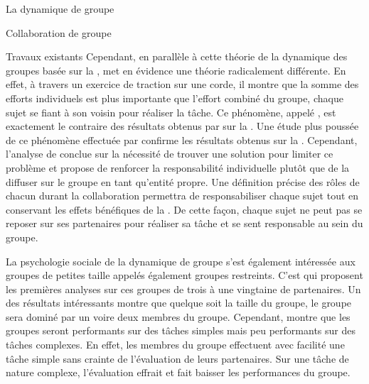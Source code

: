 \documentclass[myfrancais]{mythesis}
\begin{document}
\begin{mychapter}{La dynamique de groupe}
\begin{mysection}{Collaboration de groupe}
\begin{mysubsection}{Travaux existants}
				Cependant, en parallèle à cette théorie de la dynamique des groupes basée sur la ,  met en évidence une théorie radicalement différente.
				En effet, à travers un exercice de traction sur une corde, il montre que la somme des efforts individuels est plus importante que l'effort combiné du groupe, chaque sujet se fiant à son voisin pour réaliser la tâche.
				Ce phénomène, appelé , est exactement le contraire des résultats obtenus par  sur la .
				Une étude plus poussée de ce phénomène effectuée par  confirme les résultats obtenus sur la .
				Cependant, l'analyse de  conclue sur la nécessité de trouver une solution pour limiter ce problème et propose de renforcer la responsabilité individuelle plutôt que de la diffuser sur le groupe en tant qu'entité propre.
				Une définition précise des rôles de chacun durant la collaboration permettra de responsabiliser chaque sujet tout en conservant les effets bénéfiques de la .
				De cette façon, chaque sujet ne peut pas se reposer sur ses partenaires pour réaliser sa tâche et se sent responsable au sein du groupe.

				La psychologie sociale de la dynamique de groupe s'est également intéressée aux groupes de petites taille appelés également groupes restreints.
				C'est  qui proposent les premières analyses sur ces groupes de trois à une vingtaine de partenaires.
				Un des résultats intéressants montre que quelque soit la taille du groupe, le groupe sera dominé par un voire deux membres du groupe.
				Cependant,  montre que les groupes seront performants sur des tâches simples mais peu performants sur des tâches complexes.
				En effet, les membres du groupe effectuent avec facilité une tâche simple sans crainte de l'évaluation de leurs partenaires.
				Sur une tâche de nature complexe, l'évaluation effrait et fait baisser les performances du groupe.


\end{mysubsection}
\end{mysection}
\end{mychapter}
\end{document}
